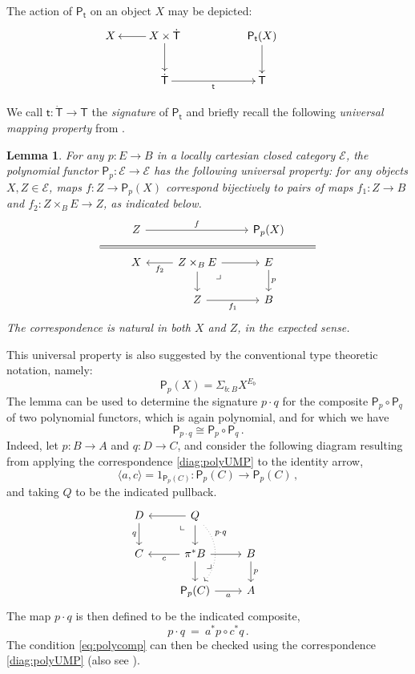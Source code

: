 \documentclass[12pt,reqno]{amsart}
\newcommand{\EE}{\ensuremath{\mathcal{E}}}
\newcommand{\alg}[1]{\ensuremath{\mathsf{#1}}}
\renewcommand{\to}{\ensuremath{\rightarrow}}
\renewcommand{\t}{\ensuremath{\mathsf{t}}}
\newcommand{\tT}{\ensuremath{{\t}:\TT\to\T}}
\newcommand{\T}{\ensuremath{\mathsf{T}}}
\newcommand{\TT}{\ensuremath{\dot{\mathsf{T}}}}
\newcommand{\pbcorner}{\arrow[dr,phantom,"\lrcorner" very near start, shift right=.5ex]} %
\newcommand{\pbcornerright}{\arrow[dl,phantom,"\llcorner" very near start, shift left=.5ex]} %
\newtheorem{lemma}[theorem]{Lemma}
\theoremstyle{remark}
\theoremstyle{definition}
\begin{document}
The action of $\alg{P}_\t$ on an object $X$ may be depicted:
\begin{equation*}
\xymatrix{
 X & \ar[l] X\times \TT \ar[d] && \alg{P}_\t(X) \ar[d] \\
	& \TT \ar[rr]_{\t} && \T 
 }\qquad\quad
 \end{equation*}


  We call $\tT$ the \emph{signature} of $\alg{P}_\t$ and briefly recall the following \emph{universal mapping property} from \cite{awodey:NM}.

\begin{lemma}
 For any $p: E \to B$ in a locally cartesian closed category $\EE$, the polynomial functor $\alg{P}_p : \EE \to \EE$ has the following universal property:  for any objects $X, Z \in \EE$, maps $f : Z \to \alg{P}_p (X)$ correspond bijectively to pairs of maps $f_1 : Z \to B$ and $f_2 : Z\times_B E \to Z$, as indicated below.
\begin{equation}\label{diag:polyUMP}
\begin{tikzcd}
&Z \ar[rr,"f"] && \alg{P}_p (X) & \\[-5ex]
\strut \ar[rrrr, equal] &&&& \strut\\[-5ex]
&X & \ar[l,"f_2"] Z\times_B E \ar[d] \ar[r] \pbcorner & E \ar[d, "p"] &\\
&& Z \ar[r,swap,"f_1"] & B &
\end{tikzcd}
\end{equation}
The correspondence is natural in both $X$ and $Z$, in the expected sense.
\end{lemma}

This universal property is also suggested by the conventional type theoretic notation, namely: $$\alg{P}_p (X) = \Sigma_{b:B} X^{E_b}$$
The lemma can be used to determine the signature $ p\cdot q $ for the composite $\alg{P}_p \circ \alg{P}_q$ of two polynomial functors, which is again polynomial, and for which we have
\begin{equation}\label{eq:polycomp}
\alg{P}_{p\cdot q} \cong \alg{P}_p \circ \alg{P}_q\,.
\end{equation}
Indeed, let $p : B \to A$ and $q : D \to C$, and consider the following diagram resulting from applying the correspondence \eqref{diag:polyUMP} to the identity arrow,
\[
\langle a, c\rangle = 1_{\alg{P}_p(C)} : \alg{P}_p(C) \to \alg{P}_p(C)\,,
\]
and taking $Q$ to be the indicated pullback.
%
\begin{equation}\label{diag:polyUMP}
\begin{tikzcd}
D \ar[d,swap,"q"] & \ar[l] Q \ar[d] \pbcornerright  \ar[dd, dotted, bend left = 10ex ,near start, "{p\cdot q}"]& & \\
 C  & \ar[l,"c"] \pi^*B \ar[d] \ar[r] \pbcorner & B \ar[d,"p"] \\
&  \alg{P}_p(C) \ar[r,swap,"a"] & A
\end{tikzcd}
\end{equation}
The map $p\cdot q$ is then defined to be the indicated composite,
\[
p\cdot q\ =\ a^*p \circ c^*q\,.
\]
The condition \eqref{eq:polycomp} can then be checked using the correspondence \eqref{diag:polyUMP} (also see \cite{GambinoKoch:2013}).
\end{document}
